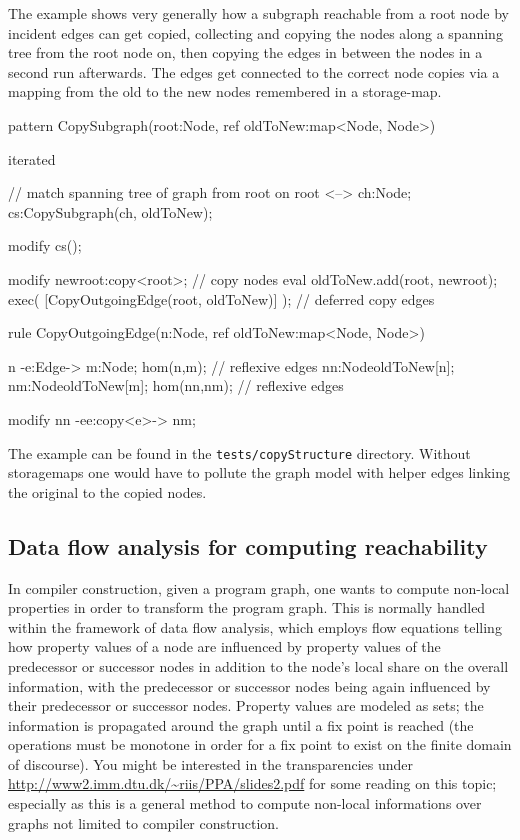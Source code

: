   \begin{example}
The example shows very generally how a subgraph reachable from a root node by incident edges can get copied, collecting and copying the nodes along a spanning tree from the root node on, then copying the edges in between the nodes in a second run afterwards. The edges get connected to the correct node copies via a mapping from the old to the new nodes remembered in a storage-map.
    \begin{grgen}
pattern CopySubgraph(root:Node, ref oldToNew:map<Node, Node>)
{
  iterated { // match spanning tree of graph from root on
    root <--> ch:Node;
    cs:CopySubgraph(ch, oldToNew);

    modify {
      cs();
    }
  }

  modify {
    newroot:copy<root>; // copy nodes
    eval { oldToNew.add(root, newroot); }
    exec( [CopyOutgoingEdge(root, oldToNew)] ); // deferred copy edges
  }
}

rule CopyOutgoingEdge(n:Node, ref oldToNew:map<Node, Node>)
{
  n -e:Edge-> m:Node;
  hom(n,m); // reflexive edges
  nn:Node{oldToNew[n]}; nm:Node{oldToNew[m]};
  hom(nn,nm); // reflexive edges

  modify {
    nn -ee:copy<e>-> nm;
  }
}
    \end{grgen}
  \end{example}

The example can be found in the \texttt{tests/copyStructure} directory.
Without storagemaps one would have to pollute the graph model with helper edges linking the original to the copied nodes.

\subsection{Data flow analysis for computing reachability}\label{subsub:flow}

In compiler construction, given a program graph, one wants to compute non-local properties in order to transform the program graph.
This is normally handled within the framework of data flow analysis, which employs flow equations telling how property values of a node are influenced by property values of the predecessor or successor nodes in addition to the node's local share on the overall information, with the predecessor or successor nodes being again influenced by their predecessor or successor nodes.
Property values are modeled as sets; the information is propagated around the graph until a fix point is reached (the operations must be monotone in order for a fix point to exist on the finite domain of discourse).
You might be interested in the transparencies under \url{http://www2.imm.dtu.dk/~riis/PPA/slides2.pdf} for some reading on this topic;
especially as this is a general method to compute non-local informations over graphs not limited to compiler construction.

